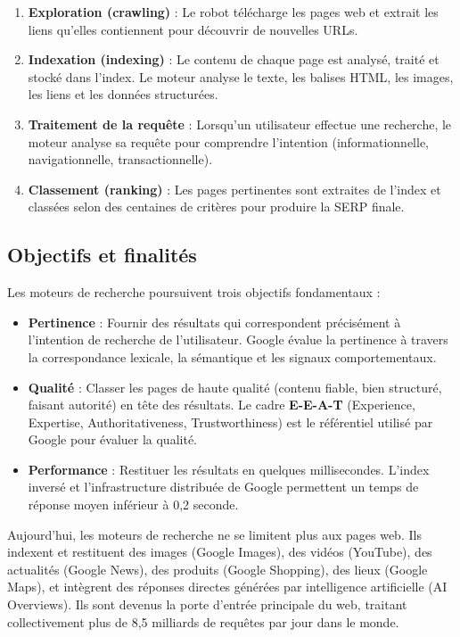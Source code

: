 \documentclass[12pt,a4paper,twoside]{report}
\newcommand{\keyword}[1]{\textbf{\textcolor{googleblue}{#1}}}
\begin{document}
\begin{enumerate}
    \item \textbf{Exploration (crawling)} : Le robot télécharge les pages web et extrait les liens qu'elles contiennent pour découvrir de nouvelles URLs.
    \item \textbf{Indexation (indexing)} : Le contenu de chaque page est analysé, traité et stocké dans l'index. Le moteur analyse le texte, les balises HTML, les images, les liens et les données structurées.
    \item \textbf{Traitement de la requête} : Lorsqu'un utilisateur effectue une recherche, le moteur analyse sa requête pour comprendre l'intention (informationnelle, navigationnelle, transactionnelle).
    \item \textbf{Classement (ranking)} : Les pages pertinentes sont extraites de l'index et classées selon des centaines de critères pour produire la SERP finale.
\end{enumerate}

\subsection*{Objectifs et finalités}

Les moteurs de recherche poursuivent trois objectifs fondamentaux :

\begin{itemize}
    \item \textbf{Pertinence} : Fournir des résultats qui correspondent précisément à l'intention de recherche de l'utilisateur. Google évalue la pertinence à travers la correspondance lexicale, la sémantique et les signaux comportementaux.
    \item \textbf{Qualité} : Classer les pages de haute qualité (contenu fiable, bien structuré, faisant autorité) en tête des résultats. Le cadre \keyword{E-E-A-T} (Experience, Expertise, Authoritativeness, Trustworthiness) est le référentiel utilisé par Google pour évaluer la qualité.
    \item \textbf{Performance} : Restituer les résultats en quelques millisecondes. L'index inversé et l'infrastructure distribuée de Google permettent un temps de réponse moyen inférieur à 0,2 seconde.
\end{itemize}

Aujourd'hui, les moteurs de recherche ne se limitent plus aux pages web. Ils indexent et restituent des images (Google Images), des vidéos (YouTube), des actualités (Google News), des produits (Google Shopping), des lieux (Google Maps), et intègrent des réponses directes générées par intelligence artificielle (AI Overviews). Ils sont devenus la porte d'entrée principale du web, traitant collectivement plus de 8,5 milliards de requêtes par jour dans le monde.
\end{document}
